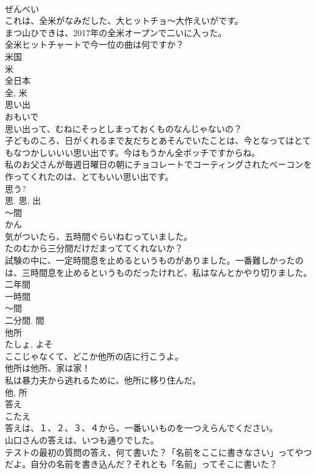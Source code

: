 \documentclass[8pt]{extreport}
\begin{document}
\begin{CJK}{UTF8}{min}
\\	ぜんべい	
\\	これは、全米がなみだした、大ヒットチョ～大作えいがです。	
\\	まつ山ひできは、2017年の全米オープンで二いに入った。	
\\	全米ヒットチャートで今一位の曲は何ですか？	
\\	米国 
\\	米 
\\	全日本 
\\	全, 米	
\\	思い出	
\\	おもいで	
\\	思い出って、むねにそっとしまっておくものなんじゃないの？	
\\	子どものころ、日がくれるまで友だちとあそんでいたことは、今となってはとてもなつかしいいい思い出です。今はもうかん全ボッチですからね。	
\\	私のお父さんが毎週日曜日の朝にチョコレートでコーティングされたベーコンを作ってくれたのは、とてもいい思い出です。	
\\	思う? 
\\	思.	思, 出	
\\	〜間	
\\	かん	
\\	気がついたら、五時間ぐらいねむっていました。	
\\	たのむから三分間だけだまっててくれないか？	
\\	試験の中に、一定時間息を止めるというものがありました。一番難しかったのは、三時間息を止めるというものだったけれど、私はなんとかやり切りました。	
\\	二年間 
\\	一時間 
\\	〜間 
\\	二分間.	間	
\\	他所	
\\	たしょ, よそ	
\\	ここじゃなくて、どこか他所の店に行こうよ。	
\\	他所は他所、家は家！	
\\	私は暴力夫から逃れるために、他所に移り住んだ。	
\\	他, 所	
\\	答え	
\\	こたえ	
\\	答えは、１、２、３、４から、一番いいものを一つえらんでください。	
\\	山口さんの答えは、いつも通りでした。	
\\	テストの最初の質問の答え、何て書いた？「名前をここに書きなさい」ってやつだよ。自分の名前を書き込んだ？それとも「名前」ってそこに書いた？	

\end{CJK}
\end{document}
